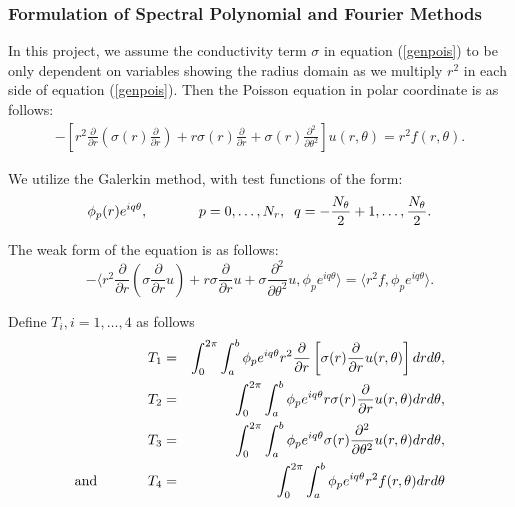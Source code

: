 \subsubsection{Formulation of Spectral Polynomial and Fourier Methods}

In this project, we assume the conductivity term $\sigma$ in
equation (\ref{genpois}) to be only dependent on variables showing
the radius domain as we multiply $r^2$ in each side of equation
(\ref{genpois}). Then the Poisson equation in polar coordinate is
as follows:
\begin{eqnarray}
-\left[r^2 \frac{\partial}{\partial r} (\sigma(r) \frac{\partial}{\partial r}) + r \sigma(r) \frac{\partial}{\partial r} + \sigma(r) \frac{\partial^2}{\partial \theta^2}\right] u(r, \theta) = r^2 f(r, \theta).
\end{eqnarray}

\vspace{0.1in}

We utilize the Galerkin method, with test functions of the form:
\begin{equation}
\phi_p(r) e^{iq\theta}, \hspace{.5in} p=0,\ldots,N_r, \;\; q = -\frac{N_\theta}{2}+1,\ldots,\frac{N_\theta}{2}.
\end{equation}

\vspace{0.1in}

The weak form of the equation is as follows:
\begin{equation}\label{galeqn}
-\langle  r^2 \frac{\partial}{\partial r} (\sigma \frac{\partial}{\partial r}u) + r \sigma \frac{\partial}{\partial r}u + \sigma \frac{\partial^2}{\partial \theta^2}u, \phi_p e^{iq\theta} \rangle = \langle r^2 f, \phi_p e^{iq\theta} \rangle.
\end{equation}

\vspace{0.1in} Define $T_i, i = 1,\ldots,4$ as follows
\begin{eqnarray}
T_1 &=& \int_{0}^{2\pi} \int_{a}^{b} \phi_p e^{iq\theta} r^2 \frac{\partial}{\partial r}\left[\sigma(r) \frac{\partial}{\partial r}u(r, \theta)\right] dr d\theta,\\
T_2 &=& \int_{0}^{2\pi} \int_{a}^{b} \phi_p e^{iq\theta} r \sigma(r) \frac{\partial}{\partial r}u(r, \theta) dr d\theta,\\
T_3 &=& \int_{0}^{2\pi} \int_{a}^{b} \phi_p e^{iq\theta} \sigma(r) \frac{\partial^2}{\partial \theta^2}u(r, \theta) dr d\theta,\\
\mbox{and} \hspace{.5in}T_4 &=& \int_{0}^{2\pi} \int_{a}^{b} \phi_p e^{iq\theta} r^2 f(r, \theta) dr d\theta
\end{eqnarray}

